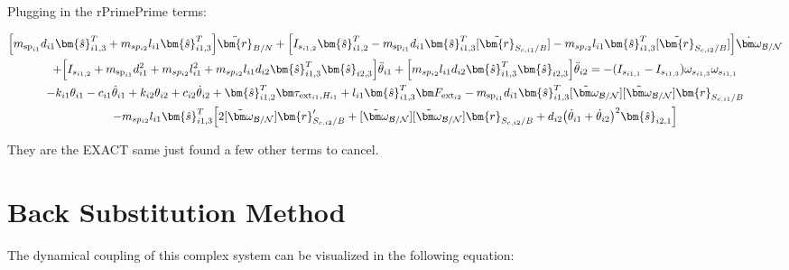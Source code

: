 \documentclass[paper]{aiaaNew}
\begin{document}
Plugging in the rPrimePrime terms:

\begin{multline}
\Big[m_{\text{sp}_{i1}} d_{i1} \bm{\hat{s}}_{i1,3}^T + m_{sp_{i2}} l_{i1} \bm{\hat{s}}_{i1,3}^T \Big] \ddot{\bm{r}}_{B/N} + \Big[I_{s_{i1,2}} \bm{\hat{s}}_{i1,2}^T - m_{\text{sp}_{i1}} d_{i1} \bm{\hat{s}}_{i1,3}^T [\tilde{\bm{r}}_{S_{c,i1}/B}] - m_{sp_{i2}} l_{i1} \bm{\hat{s}}_{i1,3}^T [\tilde{\bm{r}}_{S_{c,i2}/B}] \Big] \dot{\bm \omega}_{\cal{B/N}} \\
+ \Big[I_{s_{i1,2}} + m_{\text{sp}_{i1}} d_{i1}^2 + m_{sp_{i2}} l_{i1}^2 + m_{sp_{i2}} l_{i1} d_{i2} \bm{\hat{s}}_{i1,3}^T \bm{\hat{s}}_{i2,3} \Big] \ddot{\theta}_{i1} + \Big[m_{sp_{i2}} l_{i1} d_{i2} \bm{\hat{s}}_{i1,3}^T \bm{\hat{s}}_{i2,3} \Big]\ddot{\theta}_{i2}
= - (I_{s_{i1,1}} - I_{s_{i1,3}}) \omega_{s_{i1,3}} \omega_{s_{i1,1}}\\ -k_{i1} \theta_{i1} - c_{i1} \dot{\theta}_{i1} 
+ k_{i2} \theta_{i2} + c_{i2} \dot{\theta}_{i2} + \bm{\hat{s}}_{i1,2}^T \bm \tau_{\text{ext}_{i1},H_{i1}}
+ l_{i1} \bm{\hat{s}}_{i1,3}^T \bm F_{\text{ext}_{i2}} 
- m_{\text{sp}_{i1}} d_{i1} \bm{\hat{s}}_{i1,3}^T [\tilde{\bm\omega}_{\cal B/N}] [\tilde{\bm\omega}_{\cal B/N}] \bm{r}_{S_{c,i1}/B}\\
- m_{sp_{i2}} l_{i1} \bm{\hat{s}}_{i1,3}^T\Big[ 2 [\tilde{\bm\omega}_{\cal B/N}] \bm{r}'_{S_{c,i2}/B} + [\tilde{\bm\omega}_{\cal B/N}] [\tilde{\bm\omega}_{\cal B/N}] \bm{r}_{S_{c,i2}/B} + d_{i2} \big(\dot{\theta}_{i1} + \dot{\theta}_{i2}\big)^2 \bm{\hat{s}}_{i2,1}\Big]
\end{multline}

They are the EXACT same just found a few other terms to cancel.

	\section{Back Substitution Method}
	The dynamical coupling of this complex system can be visualized in the following equation:
	
\end{document}
